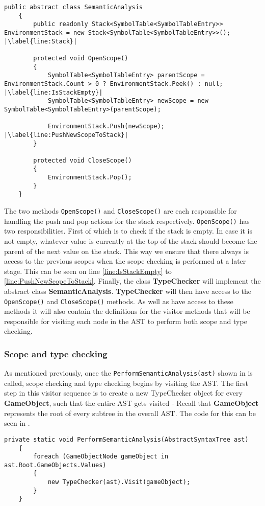\begin{lstlisting}[caption={Abstract class SemanticAnalysis}, label={lst:ACSemanticAnalysis},escapechar=|]
    public abstract class SemanticAnalysis
    {
        public readonly Stack<SymbolTable<SymbolTableEntry>> EnvironmentStack = new Stack<SymbolTable<SymbolTableEntry>>(); |\label{line:Stack}|

        protected void OpenScope()
        {
            SymbolTable<SymbolTableEntry> parentScope = EnvironmentStack.Count > 0 ? EnvironmentStack.Peek() : null; |\label{line:IsStackEmpty}|
            SymbolTable<SymbolTableEntry> newScope = new SymbolTable<SymbolTableEntry>(parentScope);
            
            EnvironmentStack.Push(newScope); |\label{line:PushNewScopeToStack}|
        }

        protected void CloseScope()
        {
            EnvironmentStack.Pop();
        }
    }
\end{lstlisting}

The two methods \texttt{OpenScope()} and \texttt{CloseScope()} are each responsible for handling the push and pop actions for the stack respectively.
\texttt{OpenScope()} has two responsibilities. First of which is to check if the stack is empty. In case it is not empty, whatever value is currently at the top of the stack should become the parent of the next value on the stack. This way we ensure that there always is access to the previous scopes when the scope checking is performed at a later stage. This can be seen on line \ref{line:IsStackEmpty} to \ref{line:PushNewScopeToStack}.
Finally, the class \textbf{TypeChecker} will implement the abstract class \textbf{SemanticAnalysis}. \textbf{TypeChecker} will then have access to the \texttt{OpenScope()} and \texttt{CloseScope()} methods. As well as have access to these methods it will also contain the definitions for the visitor methods that will be responsible for visiting each node in the AST to perform both scope and type checking.

\subsubsection*{Scope and type checking}
As mentioned previously, once the \texttt{PerformSemanticAnalysis(ast)} shown in  is called, scope checking and type checking begins by visiting the AST. The first step in this visitor sequence is to create a new TypeChecker object for every \textbf{GameObject}, such that the entire AST gets visited - Recall that \textbf{GameObject} represents the root of every subtree in the overall AST. The code for this can be seen in .

\begin{lstlisting}[caption={Typechecker object for every gameObject}, label={lst:TypeCheckEachGO},escapechar=|]
    private static void PerformSemanticAnalysis(AbstractSyntaxTree ast)
    {
        foreach (GameObjectNode gameObject in ast.Root.GameObjects.Values)
        {
            new TypeChecker(ast).Visit(gameObject);
        }
    }
\end{lstlisting}